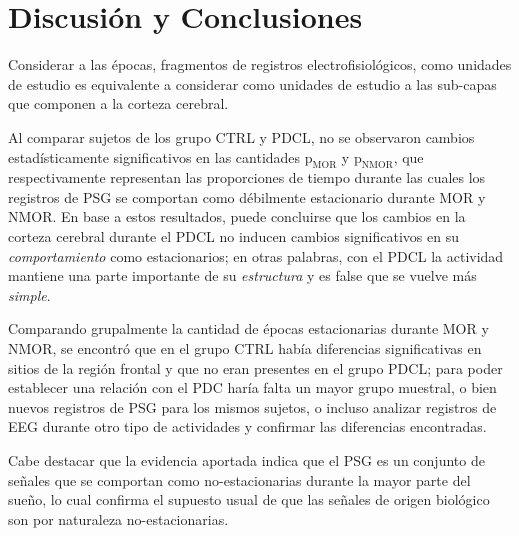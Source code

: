 
\chapter{Discusión y Conclusiones}

Considerar a las épocas, fragmentos de registros electrofisiológicos, como unidades de estudio es equivalente a considerar como unidades de estudio a las sub-capas que componen a la corteza cerebral.

Al comparar sujetos de los grupo CTRL y PDCL, no se observaron cambios estadísticamente significativos en las cantidades $\text{p}_{\text{MOR}}$ y $\text{p}_{\text{NMOR}}$, que respectivamente representan las proporciones de tiempo durante las cuales los registros de PSG se comportan como débilmente estacionario durante MOR y NMOR. 
%
En base a estos resultados, puede concluirse que los cambios en la corteza cerebral durante el PDCL no inducen cambios significativos en su \textit{comportamiento} como estacionarios;
en otras palabras, con el PDCL la actividad mantiene una parte importante de su \textit{estructura} y es false que se vuelve más \textit{simple}.

Comparando grupalmente la cantidad de épocas estacionarias durante MOR y NMOR, se encontró que en 
el grupo CTRL había diferencias significativas en sitios de la región frontal y que no eran presentes
en el grupo PDCL; para poder establecer una relación con el PDC haría falta un mayor grupo muestral, 
o bien nuevos registros de PSG para los mismos sujetos, o incluso analizar registros de EEG durante 
otro tipo de actividades y confirmar las diferencias encontradas.

Cabe destacar que la evidencia aportada indica que el PSG es un conjunto de señales que se comportan
como no-estacionarias durante la mayor parte del sueño, lo cual confirma el supuesto usual de que 
las señales de origen biológico son por naturaleza no-estacionarias. 


